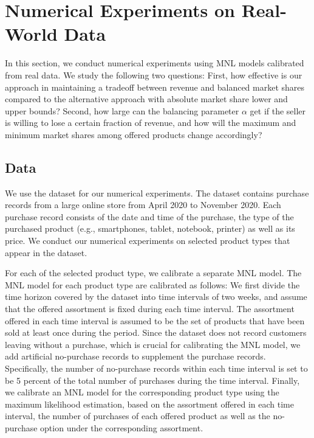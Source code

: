 \documentclass[mnsc,non-blindrev]{informs3}
\theoremstyle{definition}
\begin{document}
{ 

\section{Numerical Experiments on Real-World Data}\label{sec:numerical_real}

In this section, we conduct numerical experiments using MNL models calibrated from real data. We study the following two questions: First, how effective is our approach in maintaining a tradeoff between revenue and balanced market shares compared to the alternative approach with absolute market share lower and upper bounds? Second, how large can the balancing parameter $\alpha$ get if the seller is willing to lose a certain fraction of revenue, and how will the maximum and minimum market shares among offered products change accordingly?

\subsection{Data}

We use the dataset \cite{ECommerceData} for our numerical experiments. The dataset contains purchase records from a large online store from April 2020 to November 2020. Each purchase record consists of the date and time of the purchase, the type of the purchased product (e.g., smartphones, tablet, notebook, printer) as well as its price. We conduct our numerical experiments on selected product types that appear in the dataset. 

For each of the selected product type, we calibrate a separate MNL model. The MNL model for each product type are calibrated as follows: We first divide the time horizon covered by the dataset into time intervals of two weeks, and assume that the offered assortment is fixed during each time interval. The assortment offered in each time interval is assumed to be the set of products that have been sold at least once during the period. Since the dataset does not record customers leaving without a purchase, which is crucial for calibrating the MNL model, we add artificial no-purchase records to supplement the purchase records. Specifically, the number of no-purchase records within each time interval is set to be 5 percent of the total number of purchases during the time interval. Finally, we calibrate an MNL model for the corresponding product type using the maximum likelihood estimation, based on the assortment offered in each time interval, the number of purchases of each offered product as well as the no-purchase option under the corresponding assortment.

}
\end{document}
